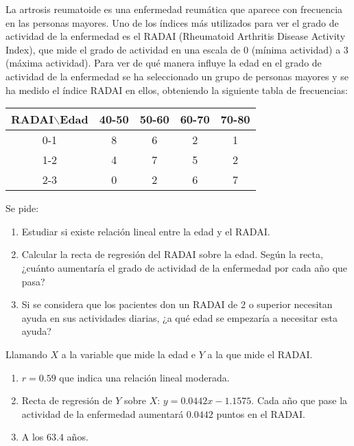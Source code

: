 {La artrosis reumatoide es una enfermedad reumática que aparece con frecuencia en las personas mayores. Uno de los índices más utilizados
para ver el grado de actividad de la enfermedad es el RADAI (Rheumatoid Arthritis Disease Activity Index), que mide el grado de actividad en
una escala de 0 (mínima actividad) a 3 (máxima actividad). Para ver de qué manera influye la edad en el grado de actividad de la enfermedad
se ha seleccionado un grupo de personas mayores y se ha medido el índice RADAI en ellos, obteniendo la siguiente tabla de frecuencias:
\begin{center}
\begin{tabular}{|c|c|c|c|c|}
\hline
 RADAI$\backslash$Edad & 40-50 & 50-60 & 60-70 & 70-80 \\
\hline
         0-1          &   8   &   6   &   2   &   1   \\
\hline
         1-2          &   4   &   7   &   5   &   2   \\
\hline
         2-3          &   0   &   2   &   6   &   7   \\
\hline
\end{tabular}
\end{center}
Se pide:
\begin{enumerate}
\item Estudiar si existe relación lineal entre la edad y el RADAI.
\item Calcular la recta de regresión del RADAI sobre la edad. Según la recta, ¿cuánto aumentaría el grado de actividad de la enfermedad por
cada año que pasa?
\item Si se considera que los pacientes don un RADAI de 2 o superior necesitan ayuda en sus actividades diarias, ¿a qué edad se empezaría a
necesitar esta ayuda?
\end{enumerate}
}
{Llamando $X$ a la variable que mide la edad e $Y$ a la que mide el RADAI.
\begin{enumerate}
\item $r=0.59$ que indica una relación lineal moderada. 
\item Recta de regresión de $Y$ sobre $X$: $y=0.0442x-1.1575$. Cada año que pase la actividad de la enfermedad aumentará $0.0442$ puntos en
el RADAI.
\item A los $63.4$ años.
\end{enumerate}
}
